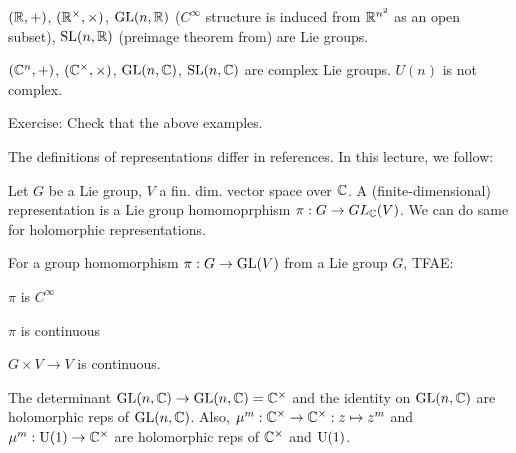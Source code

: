 \documentclass{../../small}
\begin{document}
\begin{ex}
$(\mathbb{R},+)$, $(\mathbb{R}^\times,\times)$, $\mathrm{GL}(n,\mathbb{R})$ ($C^\infty$ structure is induced from $\mathbb{R}^{n^2}$ as an open subset), $\mathrm{SL}(n,\mathbb{R})$ (preimage theorem from) are Lie groups.
\end{ex}
\begin{ex}
$(\mathbb{C}^n,+)$, $(\mathbb{C}^\times,\times)$, $\mathrm{GL}(n,\mathbb{C})$, $\mathrm{SL}(n,\mathbb{C})$ are complex Lie groups.
$U(n)$ is not complex.
\end{ex}

Exercise: Check that the above examples.


\bigskip



The definitions of representations differ in references.
In this lecture, we follow:
\begin{defn}
Let $G$ be a Lie group, $V$ a fin. dim. vector space over $\mathbb{C}$.
A (finite-dimensional) representation is a Lie group homomoprphism $\pi:G\to GL_{\mathbb{C}}(V)$.
We can do same for holomorphic representations.
\end{defn}
\begin{rmk}
For a group homomorphism $\pi:G\to\mathrm{GL}(V)$ from a Lie group $G$, TFAE:
\begin{parts}
	\item $\pi$ is $C^\infty$
	\item $\pi$ is continuous
	\item $G\times V\to V$ is continuous.
\end{parts}
\end{rmk}


\begin{ex}
The determinant $\mathrm{GL}(n,\mathbb{C})\to\mathrm{GL}(n,\mathbb{C})=\mathbb{C}^\times$ and the  identity on $\mathrm{GL}(n,\mathbb{C})$ are holomorphic reps of $\mathrm{GL}(n,\mathbb{C})$.
Also, $\mu^m:\mathbb{C}^\times\to\mathbb{C}^\times:z\mapsto z^m$ and $\mu^m:\mathrm{U}(1)\to\mathbb{C}^\times$ are holomorphic reps of $\mathbb{C}^\times$ and $\mathrm{U}(1)$.
\end{ex}
\end{document}

